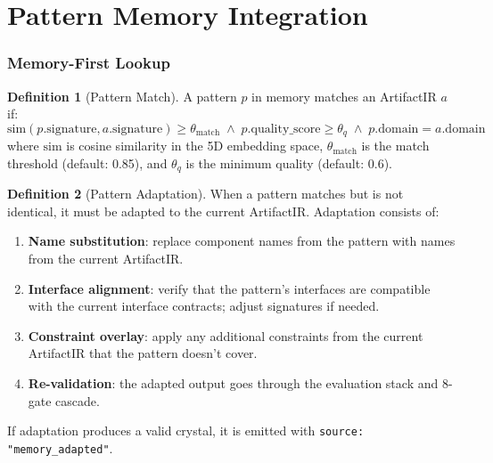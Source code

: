 \documentclass[11pt,a4paper,twoside]{article}
\theoremstyle{definition}
\newtheorem{definition}{Definition}[section]
\theoremstyle{plain}
\theoremstyle{remark}
\begin{document}
\part{Pattern Memory Integration}\label{part:memory}

\section{Memory-First Lookup}\label{sec:lookup}

\begin{definition}[Pattern Match]\label{def:match}
A pattern $p$ in memory matches an ArtifactIR $a$ if:
\[
  \mathrm{sim}(p.\mathrm{signature}, a.\mathrm{signature}) \ge
  \theta_{\mathrm{match}}
  \;\wedge\;
  p.\mathrm{quality\_score} \ge \theta_q
  \;\wedge\;
  p.\mathrm{domain} = a.\mathrm{domain}
\]
where $\mathrm{sim}$ is cosine similarity in the 5D embedding space,
$\theta_{\mathrm{match}}$ is the match threshold (default: 0.85), and
$\theta_q$ is the minimum quality (default: 0.6).
\end{definition}

\begin{definition}[Pattern Adaptation]\label{def:adapt}
When a pattern matches but is not identical, it must be adapted to
the current ArtifactIR. Adaptation consists of:
\begin{enumerate}[nosep,label=(\roman*)]
  \item \textbf{Name substitution}: replace component names from the
        pattern with names from the current ArtifactIR.
  \item \textbf{Interface alignment}: verify that the pattern's
        interfaces are compatible with the current interface
        contracts; adjust signatures if needed.
  \item \textbf{Constraint overlay}: apply any additional constraints
        from the current ArtifactIR that the pattern doesn't cover.
  \item \textbf{Re-validation}: the adapted output goes through
        the evaluation stack and 8-gate cascade.
\end{enumerate}
If adaptation produces a valid crystal, it is emitted with
\texttt{source: "memory\_adapted"}.
\end{definition}
\end{document}
